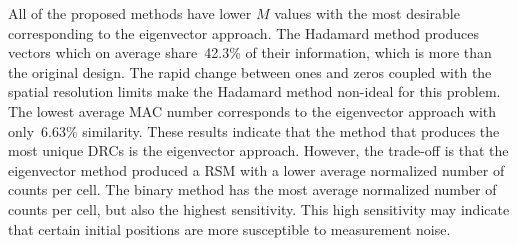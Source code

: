 \documentclass[twocolumn,10pt,final]{asme2ej}
\begin{document}
All of the proposed methods have lower $M$ values with the most desirable corresponding to the eigenvector approach.  
The Hadamard method produces vectors which on average share~42.3\% of their information, which is more than the original design.  
The rapid change between ones and zeros coupled with the spatial resolution limits make the Hadamard method non-ideal for this problem.  
The lowest average MAC number corresponds to the eigenvector approach with only~6.63\% similarity.  
These results indicate that the method that produces the most unique
DRCs is the eigenvector approach.  
However, the trade-off is that the eigenvector method produced a RSM with a lower average normalized number of counts per cell.  
The binary method has the most average normalized number of counts per cell, but also the highest sensitivity.  
This high sensitivity may indicate that certain initial positions are more susceptible to measurement noise.



\vspace{-0.3 cm}








\end{document}
